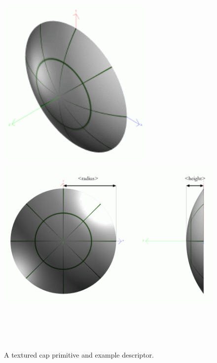 \begin{figure}
\begin{center}
   \includegraphics[width=3in]{pics/cap.png} \\
   \includegraphics[width=5in]{pics/cap-measure.png} \\
 \end{center}                
        \hspace*{2in}   \\
        \hspace*{2.2in} \\
        \hspace*{2.2in} \\    
  \hspace*{2in}         
  
        \caption[A textured cap primitive]{A textured cap primitive and example descriptor.}
        \label{fig:CapPrimitive}        
\end{figure}

